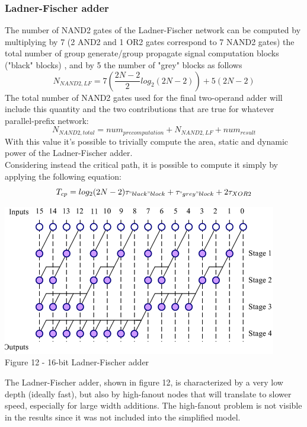\documentclass[11pt]{article} %
\begin{document}
\subsubsection{Ladner-Fischer adder}
The number of NAND2 gates of the Ladner-Fischer network can be computed by multiplying by 7 (2 AND2 and 1 OR2 gates correspond to 7 NAND2 gates) the total number of group generate/group propagate signal computation blocks ("black" blocks) , and by 5 the number of "grey" blocks as follows
$$ N_{NAND2,LF} = 7 (\frac{2N-2}{2} log_2 (2N -2)) + 5 (2N-2)$$
The total number of NAND2 gates used for the final two-operand adder will include this quantity and the two contributions that are true for whatever parallel-prefix network:
$$ N_{NAND2,total} = num_{precomputation} + N_{NAND2,LF} + num_{result} $$
With this value it's possible to trivially compute the area, static and dynamic power of the Ladner-Fischer adder.\\
Considering instead the critical path, it is possible to compute it simply by applying the following equation:
$$T_{cp} = log_2(2N-2) \tau_{"black"block} + \tau_{"grey"block} + 2 \tau_{XOR2}$$
\vspace{1em}
\begin{center}
\includegraphics[scale=.80]{ladner.PNG}\\
\small{Figure 12 - 16-bit Ladner-Fischer adder}
\end{center}
\vspace{1em}
The Ladner-Fischer adder, shown in figure 12, is characterized by a very low depth (ideally fast), but also by high-fanout nodes that will translate to slower speed, especially for large width additions. The high-fanout problem is not visible in the results since it was not included into the simplified model.
\newpage
\end{document}
